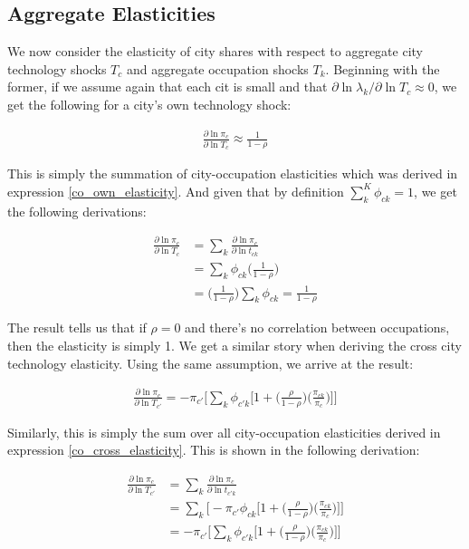 \documentclass[10pt]{article}
\begin{document}
\subsection{Aggregate Elasticities}

We now consider the elasticity of city shares with respect to aggregate city technology shocks $T_c$ and aggregate occupation shocks $T_k$. Beginning with the former, if we assume again that each cit is small and that $\partial \ln \lambda_k / \partial \ln T_c \approx 0$, we get the following for a city's own technology shock:

\begin{align*}
    \frac{\partial \ln \pi_c}{\partial \ln T_c} \approx \frac{1}{1 - \rho}
\end{align*}

This is simply the summation of city-occupation elasticities which was derived in expression \ref{co_own_elasticity}. And given that by definition $\sum \limits_k^K \phi_{ck} = 1$, we get the following derivations:

\begin{align*}
    \frac{\partial{\ln{\pi_{c}}}}{\partial\ln{T_{c}}} & = \sum\limits_{k}\frac{\partial{\ln{\pi_{c}}}}{\partial\ln{t_{ck}}} \\ &= \sum\limits_{k}\phi_{ck}\Bigg(\frac{1}{1-\rho}\Bigg) \\ &= \Bigg(\frac{1}{1-\rho}\Bigg)\sum\limits_{k}\phi_{ck} = \frac{1}{1-\rho}
\end{align*}

The result tells us that if $\rho = 0$ and there's no correlation between occupations, then the elasticity is simply 1. We get a similar story when deriving the cross city technology elasticity. Using the same assumption, we arrive at the result:

\begin{align}
    \frac{\partial\ln{\pi_{c}}}{\partial\ln{T_{c'}}} = -\pi_{c'}\Bigg[\sum\limits_{k}\phi_{{c'}k}\Big[1+\Big(\frac{\rho}{1-\rho}\Big)\Big(\frac{\pi_{ck}}{\pi_{c}}\Big)\Big]\Bigg]
    \label{city_cross_elasticity}
\end{align}

Similarly, this is simply the sum over all city-occupation elasticities derived in expression \ref{co_cross_elasticity}. This is shown in the following derivation:

\begin{align*}
    \frac{\partial\ln{\pi_{c}}}{\partial\ln{T_{c'}}} & = \sum\limits_{k}\frac{\partial\ln{\pi_{c}}}{\partial\ln{t_{{c'}k}}} \\ &= \sum\limits_{k}\Bigg[-{\pi_{c'}}{\phi_{ck}}\Big[1+\Big(\frac{\rho}{1-\rho}\Big)\Big(\frac{\pi_{ck}}{\pi_{c}}\Big)\Big]\Bigg]\\ &= -\pi_{c'}\Bigg[\sum\limits_{k}\phi_{{c'}k}\Big[1+\Big(\frac{\rho}{1-\rho}\Big)\Big(\frac{\pi_{ck}}{\pi_{c}}\Big)\Big]\Bigg]
\end{align*}
\end{document}
